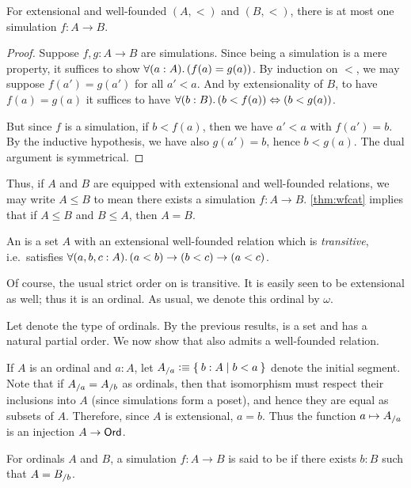 \begin{lem}
  For extensional and well-founded $(A,<)$ and $(B,<)$, there is at most one simulation $f:A\to B$.
\end{lem}
\begin{proof}
  Suppose $f,g:A\to B$ are simulations.
  Since being a simulation is a mere property, it suffices to show $\fall{a:A}(f(a)=g(a))$.
  By induction on $<$, we may suppose $f(a')=g(a')$ for all $a'<a$.
  And by extensionality of $B$, to have $f(a)=g(a)$ it suffices to have $\fall{b:B}(b<f(a)) \Leftrightarrow (b<g(a))$.

  But since $f$ is a simulation, if $b<f(a)$, then we have $a'<a$ with $f(a')=b$.
  By the inductive hypothesis, we have also $g(a')=b$, hence $b<g(a)$.
  The dual argument is symmetrical.
\end{proof}

Thus, if $A$ and $B$ are equipped with extensional and well-founded relations, we may write $A\le B$ to mean there exists a simulation $f:A\to B$.
\autoref{thm:wfcat} implies that if $A\le B$ and $B\le A$, then $A=B$.

\begin{defn}
  An 
  is a set $A$ with an extensional well-founded relation which is \emph{transitive}, i.e.\ satisfies $\fall{a,b,c:A}(a<b)\to (b<c) \to (a<c)$.
\end{defn}

\begin{eg}
  Of course, the usual strict order on \nat is transitive.
  It is easily seen to be extensional as well; thus it is an ordinal.
  As usual, we denote this ordinal by $\omega$.
\end{eg}

Let \ord denote the type of ordinals.
By the previous results, \ord is a set and has a natural partial order.
We now show that \ord also admits a well-founded relation.

If $A$ is an ordinal and $a:A$, let ${A}_{/a} \vcentcolon\equiv \Set{ b:A | b<a}$ denote the initial segment.
%
Note that if ${A}_{/a} = {A}_{/b}$ as ordinals, then that isomorphism must respect their inclusions into $A$ (since simulations form a poset), and hence they are equal as subsets of $A$.
Therefore, since $A$ is extensional, $a=b$.
Thus the function $a\mapsto {A}_{/a}$ is an injection $A\to \mathsf{Ord}$.

\begin{defn}
  For ordinals $A$ and $B$, a simulation $f:A\to B$ is said to be 
  if there exists $b:B$ such that $A = {B}_{/b}$.
\end{defn}

